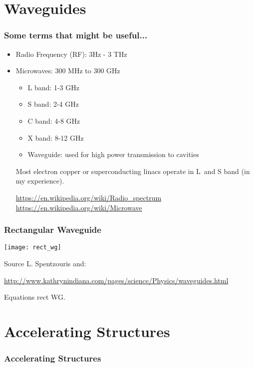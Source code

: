 \documentclass[professionalfonts,t]{beamer}
\begin{document}
\section{Waveguides}
\begin{frame}
\frametitle{Some terms that might be useful...}
\begin{itemize}
	\item Radio Frequency (RF): 3Hz - 3 THz
	\item Microwaves: 300 MHz to 300 GHz 
	\begin{itemize}
		\item L band: 1-3 GHz
		\item S band: 2-4 GHz
		\item C band: 4-8 GHz
		\item X band: 8-12 GHz
	\item Waveguide: used for high power transmission to cavities
	\end{itemize}

\vspace{1em}

Most electron copper or superconducting linacs 
operate in L~and S band (in my experience). 

\vspace{1em}
\url{https://en.wikipedia.org/wiki/Radio_spectrum}
\url{https://en.wikipedia.org/wiki/Microwave}
\end{itemize}
\end{frame}

\begin{frame}
\frametitle{Rectangular Waveguide}
\begin{center}
	\texttt{[image: rect\_wg]}
\end{center}

Source L. Spentzouris and:

\tiny\url{http://www.kathrynindiana.com/pages/science/Physics/waveguides.html}
\end{frame}

\begin{frame}
	Equations rect WG. 
\end{frame}
\section{Accelerating Structures}
\begin{frame}
\frametitle{Accelerating Structures}

\end{frame}
\end{document}
